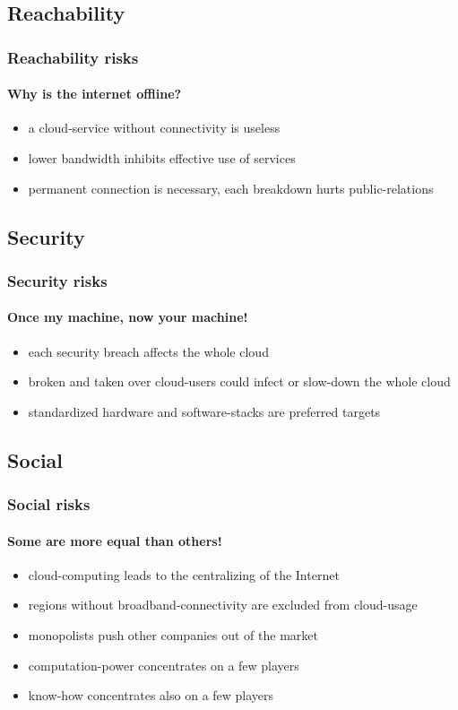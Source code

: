 \documentclass[]{beamer}
\begin{document}
\subsection{Reachability}

\begin{frame}
        \frametitle{Reachability risks}
        \framesubtitle{Why is the internet offline?}
        \begin{itemize}
                \item a cloud-service without connectivity is useless
                \item lower bandwidth inhibits effective use of services
                \item permanent connection is necessary, each breakdown hurts
                public-relations
        \end{itemize}
\end{frame}

\subsection{Security}

\begin{frame}
        \frametitle{Security risks}
        \framesubtitle{Once my machine, now your machine!}
        \begin{itemize}
                \item each security breach affects the whole cloud
                \item broken and taken over cloud-users could infect or
                slow-down the whole cloud
                \item standardized hardware and software-stacks are preferred
                targets
        \end{itemize}
\end{frame}

\subsection{Social}

\begin{frame}
        \frametitle{Social risks}
        \framesubtitle{Some are more equal than others!}
        \begin{itemize}
                \item cloud-computing leads to the centralizing of the Internet
                \item regions without broadband-connectivity are excluded from
                cloud-usage
                \item monopolists push other companies out of the market
                \item computation-power concentrates on a few players
                \item know-how concentrates also on a few players
        \end{itemize}
\end{frame}
\end{document}
